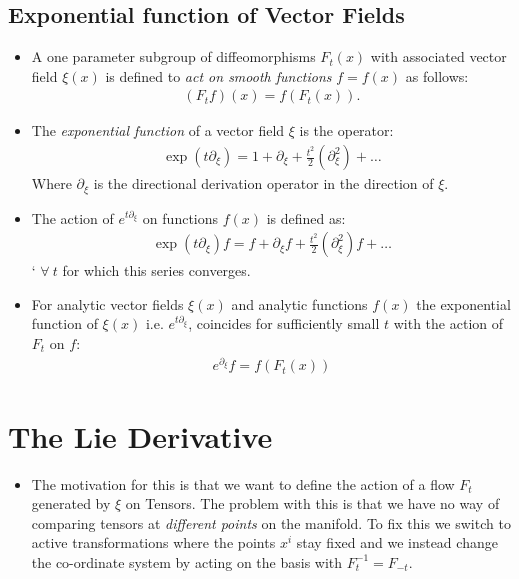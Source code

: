\documentclass[11pt]{article}
\numberwithin{equation}{section}
\newcommand{\I}[1]{\emph{#1}}
\begin{document}
\subsection{Exponential function of Vector Fields} %
\label{sub:exponential_function_of_vector_fields}
\begin{itemize}
  \item A one parameter subgroup of diffeomorphisms $F_t(x)$ with associated vector field $\xi(x)$ is defined to \I{act on smooth functions} $f=f(x)$ as follows:
  \begin{align*}
    (F_tf)(x) = f(F_t(x)). 
    \end{align*}  
    \item The \I{exponential function} of a vector field $\xi$ is the operator:
    \begin{align*}
    \exp(t\partial_{\xi}) = 1+ \partial_{\xi}+\frac{t^2}{2}(\partial_{\xi}^2)+ \ldots
    \end{align*}
    Where $\partial_{\xi}$ is the directional derivation operator in the direction of $\xi$. 

    \item The action of $e^{t\partial_{\xi}}$ on functions $f(x)$ is defined as:
    \begin{align*}
       \exp(t\partial_{\xi})f = f+ \partial_{\xi}f+\frac{t^2}{2}(\partial_{\xi}^2)f+ \ldots
       \end{align*}   `
      $\forall~t$ for which this series converges. 

       \item  For analytic vector fields $\xi(x)$ and analytic functions $f(x)$ the exponential function of $\xi(x)$ i.e. $e^{t\partial_{\xi}}$, coincides for sufficiently small $t$ with the action of $F_t$ on $f$:
       \begin{align*}
        e^{\partial_{\xi}}f = f(F_t(x))
        \end{align*} 
\end{itemize}

\newpage 
\section{The Lie Derivative} %
\label{sec:the_lie_derivative}
\begin{itemize}
  \item The motivation for this is that we want to define the action of a flow $F_t$ generated by $\xi$ on Tensors. The problem with this is that we have no way of comparing tensors at \I{different points} on the manifold. To fix this we switch to active transformations where the points $x^i$ stay fixed and we instead change the co-ordinate system by acting on the basis with $F_t^{-1} = F_{-t}$. 
\end{itemize}
\end{document}
